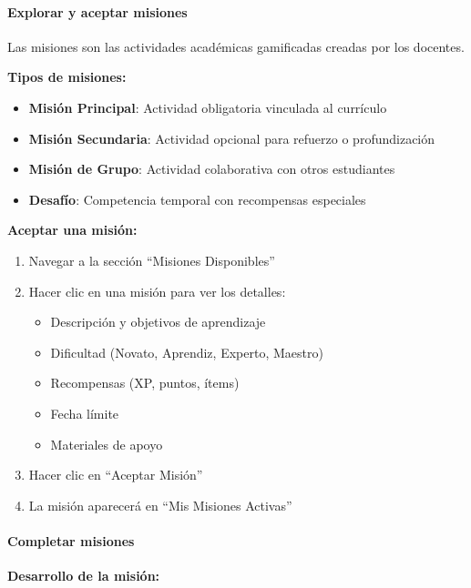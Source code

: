 \paragraph{Explorar y aceptar misiones}

Las misiones son las actividades académicas gamificadas creadas por los docentes.

\textbf{Tipos de misiones:}

\begin{itemize}
	\item \textbf{Misión Principal}: Actividad obligatoria vinculada al currículo
	\item \textbf{Misión Secundaria}: Actividad opcional para refuerzo o profundización
	\item \textbf{Misión de Grupo}: Actividad colaborativa con otros estudiantes
	\item \textbf{Desafío}: Competencia temporal con recompensas especiales
\end{itemize}

\textbf{Aceptar una misión:}

\begin{enumerate}
	\item Navegar a la sección ``Misiones Disponibles''
	\item Hacer clic en una misión para ver los detalles:
	\begin{itemize}
		\item Descripción y objetivos de aprendizaje
		\item Dificultad (Novato, Aprendiz, Experto, Maestro)
		\item Recompensas (XP, puntos, ítems)
		\item Fecha límite
		\item Materiales de apoyo
	\end{itemize}
	\item Hacer clic en ``Aceptar Misión''
	\item La misión aparecerá en ``Mis Misiones Activas''
\end{enumerate}

\paragraph{Completar misiones}

\textbf{Desarrollo de la misión:}

